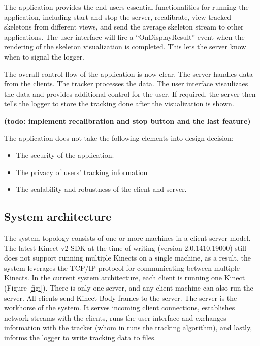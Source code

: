 \documentclass{sigchi}
\begin{document}
The application provides the end users essential functionalities for running the application, including start and stop the server, recalibrate, view tracked skeletons from different views, and send the average skeleton stream to other applications. The user interface will fire a ``OnDisplayResult'' event when the rendering of the skeleton visualization is completed. This lets the server know when to signal the logger.

The overall control flow of the application is now clear. The server handles data from the clients. The tracker processes the data. The user interface visaulizaes the data and provides additional control for the user. If required, the server then tells the logger to store the tracking done after the visualization is shown.

\textbf{(todo: implement recalibration and stop button and the last feature)}

The application does not take the following elements into design decision:

\begin{itemize}
  \item The security of the application.
  \item The privacy of users' tracking information
  \item The scalability and robustness of the client and server.
\end{itemize}


\subsection{System architecture}

The system topology consists of one or more machines in a client-server model. The latest Kinect v2 SDK at the time of writing (version 2.0.1410.19000) still does not support running multiple Kinects on a single machine, as a result, the system leverages the TCP/IP protocol for communicating between multiple Kinects. In the current system architecture, each client is running one Kinect (Figure \ref{fig:}). There is only one server, and any client machine can also run the server. All clients send Kinect Body frames to the server. The server is the workhorse of the system. It serves incoming client connections, establishes network streams with the clients, runs the user interface and exchanges information with the tracker (whom in runs the tracking algorithm), and lastly, informs the logger to write tracking data to files.
\end{document}
